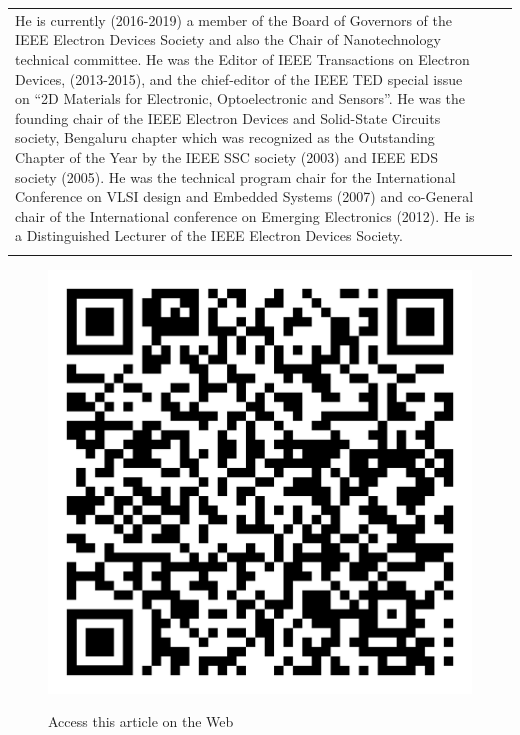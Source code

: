 {\begin{longtable}{V{2.5}p{.95\textwidth}V{2.5}}
\bigskip

He is currently (2016-2019) a member of the Board of Governors of the IEEE Electron Devices Society and also the Chair of Nanotechnology technical committee. He was the Editor of IEEE Transactions on Electron Devices, (2013-2015),  and the chief-editor of the IEEE TED special issue on “2D Materials for Electronic, Optoelectronic and Sensors”. He was the founding chair of the IEEE Electron Devices and Solid-State Circuits society, Bengaluru chapter which was recognized as the Outstanding Chapter of the Year by the IEEE SSC society (2003) and IEEE EDS society (2005). He was the technical program chair for the International Conference on VLSI design and Embedded Systems (2007) and co-General chair of the International conference on Emerging Electronics (2012). He is a Distinguished Lecturer of the IEEE Electron Devices Society.\\ 

\end{longtable}}\relax


\begin{figure}[H]
\centering
\includegraphics[scale=.15]{src/Figures/QR-codes/qr-code_nanotechnology.png}

\medskip

{\large\sf Access this article on the Web}
\end{figure}
